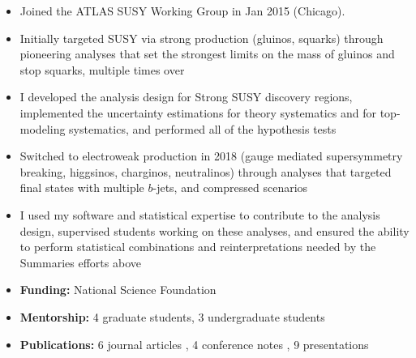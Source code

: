 \begin{itemize}
	\setlength{\itemsep}{0em}
	\item Joined the ATLAS SUSY Working Group in Jan 2015 (Chicago).
	\item Initially targeted SUSY via strong production (gluinos, squarks) through pioneering analyses that set the strongest limits on the mass of gluinos and stop squarks, multiple times over
	\item I developed the analysis design for Strong SUSY discovery regions, implemented the uncertainty estimations for theory systematics and for top-modeling systematics, and performed all of the hypothesis tests
	\item Switched to electroweak production in 2018 (gauge mediated supersymmetry breaking, higgsinos, charginos, neutralinos) through analyses that targeted final states with multiple $b$-jets, and compressed scenarios
	\item I used my software and statistical expertise to contribute to the analysis design, supervised students working on these analyses, and ensured the ability to perform statistical combinations and reinterpretations needed by the Summaries efforts above
	\item \textbf{Funding:} National Science Foundation
	\item \textbf{Mentorship:} 4 graduate students, 3 undergraduate students
	\item \textbf{Publications:} 6 journal articles , 4 conference notes , 9 presentations 
\end{itemize}

\\

\\

